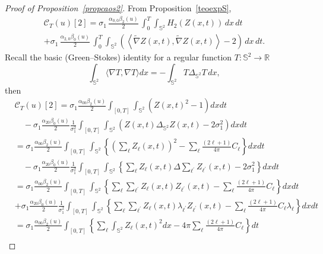 \documentclass[10pt]{amsart}
\theoremstyle{definition}\newtheorem{defi}[theo]{Definition}\newtheorem{rema}[theo]{Remark}\newtheorem{exam}[theo]{Example}\newtheorem{exem}[theo]{Example}\newtheorem{nota}[theo]{Notation}
\newcommand{\clC}{\mathcal{C}}
\newcommand{\bbS}{\mathbb{S}}
\newcommand{\bbR}{\mathbb{R}}
\begin{document}
\begin{proof}[{Proof of Proposition~\ref{propcaos2}}]
From Proposition~\ref{teoexpS},
\begin{multline*}
\clC_T(u)[2] = \sigma_1 \,\frac{\alpha _{0,0}\beta _{2}(u)}{2}
\,\int_0^T \int_{\bbS^2} H_{2}(Z(x,t))\,dx\,dt \\
+\sigma_1 \,\frac{\alpha _{2,0}\beta _{0}(u)}{2} \, \int_0^T\int_{\bbS^2}
\left(\left\langle \widetilde \nabla Z(x,t), \widetilde \nabla Z(x,t)\right\rangle - 2 \right)\,dx\,dt.
\end{multline*}
Recall the basic (Green--Stokes) identity for a regular function $T:\bbS ^2\to \bbR$
\begin{equation*}
\int_{\bbS^{2}} \langle \nabla T, \nabla T \rangle dx=-\int_{\bbS ^{2}}T\Delta_{\bbS^2} T\,dx,
\end{equation*}
then
\begingroup
\allowdisplaybreaks
\begin{align*}
&\clC_T(u)[2] = \sigma_1 \frac{\alpha _{00}\beta _{2}(u)}{2}\int_{[0,T]}\int_{\bbS ^{2}} \left(Z(x,t)^{2}-1\right) dxdt
\\
&\quad -\sigma_1 \frac{\alpha _{20}\beta _{0}(u)}{2}\frac{1}{\sigma_1^2}\int_{[0,T]}\int_{
\bbS^{2}} \left(Z(x,t) \Delta_{\bbS^2} Z(x,t) - 2\sigma_1^2\right) d x dt\\
&=\sigma_1 \frac{\alpha _{00}\beta _{2}(u)}{2}\int_{[0,T]}\int_{\bbS ^{2}}\left\{ \left(\sum_{\ell }Z_{\ell }(x,t)\right)^{2}-\sum_{\ell }\frac{ (2\ell +1)}{4\pi }C_{\ell }\right\} dxdt \\
&\quad -\sigma_1 \frac{\alpha _{20}\beta _{0}(u)}{2}\frac{1}{\sigma_1^2}\int_{[0,T]}\int_{\bbS^{2}}\left\{\sum_{\ell }Z_{\ell }(x,t)\Delta \sum_{\ell ^{\prime }}Z_{\ell ^{\prime }}(x,t)-2\sigma_1^2\right\} dx dt\\
&=\sigma_1 \frac{\alpha _{00}\beta _{2}(u)}{2}\int_{[0,T]}\int_{\bbS ^{2}}\left\{\sum_{\ell} \sum_{\ell^{\prime}}Z_{\ell }(x,t)Z_{\ell^{\prime} }(x,t)-\sum_{\ell }\frac{(2\ell +1)}{4\pi }C_{\ell }\right\} dxdt \\
&+\sigma_1 \frac{\alpha _{20}\beta _{0}(u)}{2}\frac{1}{\sigma_1^2}\int_{[0,T]}\int_{\bbS^{2}}\left\{ \sum_{\ell }\sum_{\ell ^{\prime }}Z_{\ell }(x,t)\lambda _{\ell ^{\prime }}Z_{\ell ^{\prime }}(x,t)-\sum_{\ell } \frac{ (2\ell +1)}{4\pi }C_{\ell }\lambda _{\ell }\right\} dxdt\\
&=\sigma_1 \frac{\alpha _{00}\beta _{2}(u)}{2}\int_{[0,T]}\left\{ \sum_{\ell }\int_{\bbS ^{2}} Z_{\ell }(x,t)^{2} dx-4\pi\sum_{\ell }\frac{(2\ell +1)}{4\pi }C_{\ell }\right\} dt \\

\end{align*}
\end{proof}
\end{document}
